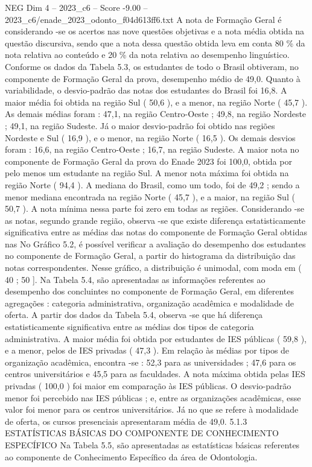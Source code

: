 \begin{textsample}{NEG Dim 4 – 2023\_c6 – Score -9.00 – 2023\_c6/enade\_2023\_odonto\_f04d613ff6.txt}
A nota de Formação Geral é considerando -se os acertos nas nove questões objetivas e a nota média obtida na questão discursiva, sendo que a nota dessa questão obtida leva em conta 80 \% da nota relativa ao conteúdo e 20 \% da nota relativa ao desempenho linguístico.
Conforme os dados da Tabela 5.3, os estudantes de todo o Brasil obtiveram, no componente de Formação Geral da prova, desempenho médio de 49,0.
Quanto à variabilidade, o desvio-padrão das notas dos estudantes do Brasil foi 16,8.
A maior média foi obtida na região Sul ( 50,6 ), e a menor, na região Norte ( 45,7 ).
As demais médias foram : 47,1, na região Centro-Oeste ; 49,8, na região Nordeste ; 49,1, na região Sudeste.
Já o maior desvio-padrão foi obtido nas regiões Nordeste e Sul ( 16,9 ), e o menor, na região Norte ( 16,5 ).
Os demais desvios foram : 16,6, na região Centro-Oeste ; 16,7, na região Sudeste.
A maior nota no componente de Formação Geral da prova do Enade 2023 foi 100,0, obtida por pelo menos um estudante na região Sul.
A menor nota máxima foi obtida na região Norte ( 94,4 ).
A mediana do Brasil, como um todo, foi de 49,2 ; sendo a menor mediana encontrada na região Norte ( 45,7 ), e a maior, na região Sul ( 50,7 ).
A nota mínima nessa parte foi zero em todas as regiões.
Considerando -se as notas, segundo grande região, observa -se que existe diferença estatisticamente significativa entre as médias das notas do componente de Formação Geral obtidas nas No Gráfico 5.2, é possível verificar a avaliação do desempenho dos estudantes no componente de Formação Geral, a partir do histograma da distribuição das notas correspondentes.
Nesse gráfico, a distribuição é unimodal, com moda em ( 40 ; 50 ].
Na Tabela 5.4, são apresentadas as informações referentes ao desempenho dos concluintes no componente de Formação Geral, em diferentes agregações : categoria administrativa, organização acadêmica e modalidade de oferta.
A partir dos dados da Tabela 5.4, observa -se que há diferença estatisticamente significativa entre as médias dos tipos de categoria administrativa.
A maior média foi obtida por estudantes de IES públicas ( 59,8 ), e a menor, pelos de IES privadas ( 47,3 ).
Em relação às médias por tipos de organização acadêmica, encontra -se : 52,3 para as universidades ; 47,6 para os centros universitários e 45,5 para as faculdades.
A nota máxima obtida pelas IES privadas ( 100,0 ) foi maior em comparação às IES públicas.
O desvio-padrão menor foi percebido nas IES públicas ; e, entre as organizações acadêmicas, esse valor foi menor para os centros universitários.
Já no que se refere à modalidade de oferta, os cursos presenciais apresentaram média de 49,0. 5.1.3 ESTATÍSTICAS BÁSICAS DO COMPONENTE DE CONHECIMENTO ESPECÍFICO Na Tabela 5.5, são apresentadas as estatísticas básicas referentes ao componente de Conhecimento Específico da área de Odontologia.

\end{textsample}
